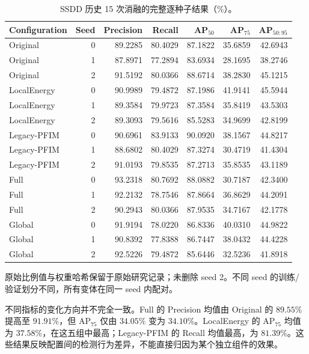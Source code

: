 \documentclass[journal]{IEEEtran}
\begin{document}
\begin{table}[!t]
\centering
\small
\setlength{\tabcolsep}{3pt}
\caption{SSDD 历史 15 次消融的完整逐种子结果（\%）。}
\label{tab:ssdd_individual}
\begin{tabular*}{\textwidth}{@{\extracolsep{\fill}}lrrrrrr}
\toprule
Configuration & Seed & Precision & Recall & AP$_{50}$ & AP$_{75}$ & AP$_{50:95}$ \\
\midrule
Original & 0 & 89.2285 & 80.4029 & 87.1822 & 35.6859 & 42.6943 \\
Original & 1 & 87.8971 & 77.2894 & 83.6934 & 28.1695 & 38.2746 \\
Original & 2 & 91.5192 & 80.0366 & 88.6714 & 38.2830 & 45.1215 \\
\midrule
LocalEnergy & 0 & 90.9989 & 79.4872 & 87.1986 & 41.9141 & 45.5944 \\
LocalEnergy & 1 & 89.3584 & 79.9723 & 87.3584 & 35.8419 & 43.5303 \\
LocalEnergy & 2 & 89.3093 & 79.5616 & 85.5283 & 34.9699 & 42.8199 \\
\midrule
Legacy-PFIM & 0 & 90.6961 & 83.9133 & 90.0920 & 38.1567 & 44.8217 \\
Legacy-PFIM & 1 & 88.6802 & 80.4029 & 87.3274 & 30.4719 & 41.4304 \\
Legacy-PFIM & 2 & 91.0193 & 79.8535 & 87.2713 & 35.8535 & 43.1189 \\
\midrule
Full & 0 & 93.2318 & 80.7692 & 88.0882 & 30.7187 & 42.3400 \\
Full & 1 & 92.2132 & 78.7546 & 87.8664 & 36.8629 & 44.2091 \\
Full & 2 & 90.2943 & 80.0366 & 87.9535 & 34.7167 & 42.1778 \\
\midrule
Global & 0 & 91.9194 & 78.0220 & 86.8336 & 40.0310 & 44.9822 \\
Global & 1 & 90.8392 & 77.8388 & 86.7447 & 38.0432 & 44.4228 \\
Global & 2 & 92.5226 & 79.4872 & 85.6446 & 32.5236 & 41.8918 \\
\bottomrule
\end{tabular*}
\smallskip
\begin{minipage}{\linewidth}
\footnotesize
原始比例值与权重哈希保留于原始研究记录；未删除 seed 2。不同 seed 的训练/验证划分不同，所有变体在同一 seed 内配对。
\end{minipage}
\end{table}

不同指标的变化方向并不完全一致。Full 的 Precision 均值由 Original 的 $89.55\%$ 提高至 $91.91\%$，但 $\mathrm{AP}_{75}$ 仅由 $34.05\%$ 变为 $34.10\%$。LocalEnergy 的 $\mathrm{AP}_{75}$ 均值为 $37.58\%$，在这五组中最高；Legacy-PFIM 的 Recall 均值最高，为 $81.39\%$。这些结果反映配置间的检测行为差异，不能直接归因为某个独立组件的效果。
\end{document}

